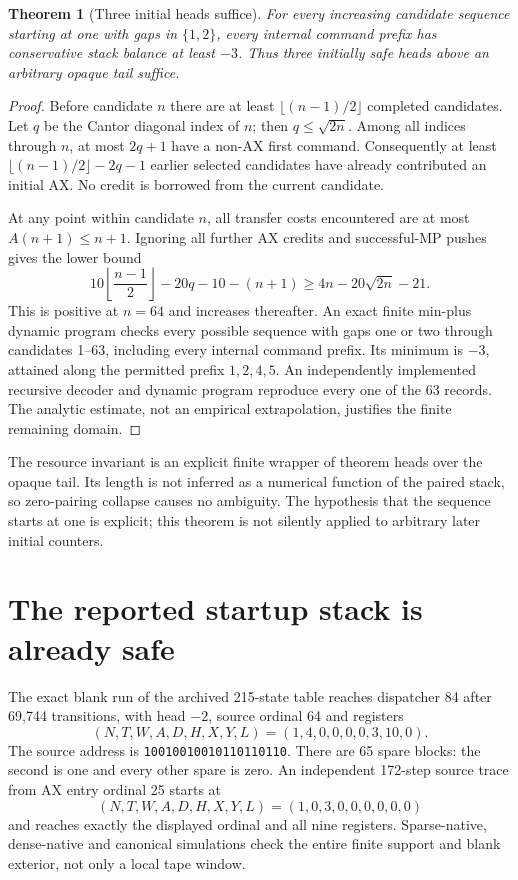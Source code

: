 \documentclass[11pt]{article}
\newtheorem{theorem}{Theorem}
\begin{document}
\begin{theorem}[Three initial heads suffice]
For every increasing candidate sequence starting at one with gaps in $\{1,2\}$, every internal command prefix has conservative stack balance at least $-3$. Thus three initially safe heads above an arbitrary opaque tail suffice.
\end{theorem}
\begin{proof}
Before candidate $n$ there are at least $\lfloor(n-1)/2\rfloor$ completed candidates. Let $q$ be the Cantor diagonal index of $n$; then $q\le\sqrt{2n}$. Among all indices through $n$, at most $2q+1$ have a non-AX first command. Consequently at least $\lfloor(n-1)/2\rfloor-2q-1$ earlier selected candidates have already contributed an initial AX. No credit is borrowed from the current candidate.

At any point within candidate $n$, all transfer costs encountered are at most $A(n+1)\le n+1$. Ignoring all further AX credits and successful-MP pushes gives the lower bound
\[
 10\left\lfloor\frac{n-1}{2}\right\rfloor-20q-10-(n+1)
 \ge4n-20\sqrt{2n}-21.
\]
This is positive at $n=64$ and increases thereafter. An exact finite min-plus dynamic program checks every possible sequence with gaps one or two through candidates 1--63, including every internal command prefix. Its minimum is $-3$, attained along the permitted prefix $1,2,4,5$. An independently implemented recursive decoder and dynamic program reproduce every one of the 63 records. The analytic estimate, not an empirical extrapolation, justifies the finite remaining domain.
\end{proof}

The resource invariant is an explicit finite wrapper of theorem heads over the opaque tail. Its length is not inferred as a numerical function of the paired stack, so zero-pairing collapse causes no ambiguity. The hypothesis that the sequence starts at one is explicit; this theorem is not silently applied to arbitrary later initial counters.

\section{The reported startup stack is already safe}
The exact blank run of the archived 215-state table reaches dispatcher 84 after 69,744 transitions, with head $-2$, source ordinal 64 and registers
\[
 (N,T,W,A,D,H,X,Y,L)=(1,4,0,0,0,0,3,10,0).
\]
The source address is \texttt{10010010010110110110}. There are 65 spare blocks: the second is one and every other spare is zero. An independent 172-step source trace from AX entry ordinal 25 starts at
\[
 (N,T,W,A,D,H,X,Y,L)=(1,0,3,0,0,0,0,0,0)
\]
and reaches exactly the displayed ordinal and all nine registers. Sparse-native, dense-native and canonical simulations check the entire finite support and blank exterior, not only a local tape window.
\end{document}
